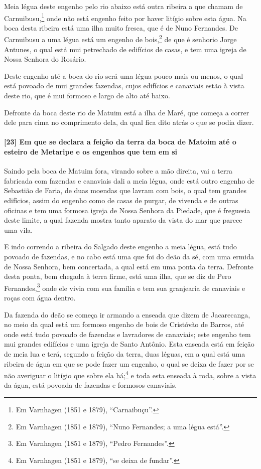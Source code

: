 Meia légua deste engenho pelo rio abaixo está outra ribeira a que chamam de
Carnuibusu,\footnote{ Em Varnhagen (1851 e 1879), ``Carnaibuçu''.} onde não está engenho
feito por haver litígio sobre esta água. Na boca desta ribeira está uma ilha muito fresca,
que é de Nuno Fernandes. De Carnuibusu a uma légua está um engenho de bois,\footnote{ Em
Varnhagen (1851 e 1879), ``Nuno Fernandes; a uma légua está''.} de que é senhorio Jorge
Antunes, o qual está mui petrechado de edifícios de casas, e tem uma igreja de Nossa
Senhora do Rosário.

Deste engenho até a boca do rio será uma légua pouco mais ou menos, o qual está povoado de
mui grandes fazendas, cujos edifícios e canaviais estão à vista deste rio, que é mui
formoso e largo de alto até baixo.

Defronte da boca deste rio de Matuim está a ilha de Maré, que começa a correr dele para
cima no comprimento dela, da qual fica dito atrás o que se podia dizer.

\paragraph{[23] Em que se declara a feição da terra da boca de Matoim até o esteiro de
Metaripe e os engenhos que tem em si}\quad
Saindo pela boca de Matuim fora, virando sobre a mão direita, vai a terra fabricada com
fazendas e canaviais dali a meia légua, onde está outro engenho de Sebastião de Faria, de
duas moendas que lavram com bois, o qual tem grandes edifícios, assim do engenho como de
casas de purgar, de vivenda e de outras oficinas e tem uma formosa igreja de Nossa Senhora
da Piedade, que é freguesia deste limite, a qual fazenda mostra tanto aparato da vista do
mar que parece uma vila.

E indo correndo a ribeira do Salgado deste engenho a meia légua, está tudo povoado de
fazendas, e no cabo está uma que foi do deão da sé, com uma ermida de Nossa Senhora, bem
concertada, a qual está em uma ponta da terra. Defronte desta ponta, bem chegada à terra
firme, está uma ilha, que se diz de Pero Fernandes,\footnote{ Em Varnhagen (1851 e 1879),
``Pedro Fernandes''.} onde ele vivia com sua família e tem sua granjearia de canaviais e
roças com água dentro.

Da fazenda do deão se começa ir armando a enseada que dizem de Jacarecanga, no meio da
qual está um formoso engenho de bois de Cristóvão de Barros, até onde está tudo povoado de
fazendas e lavradores de canaviais; este engenho tem mui grandes edifícios e uma igreja de
Santo Antônio. Esta enseada está em feição de meia lua e terá, segundo a feição da terra,
duas léguas, em a qual está uma ribeira de água em que se pode fazer um engenho, o qual se
deixa de fazer por se não averiguar o litígio que sobre ela há;\footnote{ Em Varnhagen
(1851 e 1879), ``se deixa de fundar''.} e toda esta enseada à roda, sobre a vista da água,
está povoada de fazendas e formosos canaviais.

